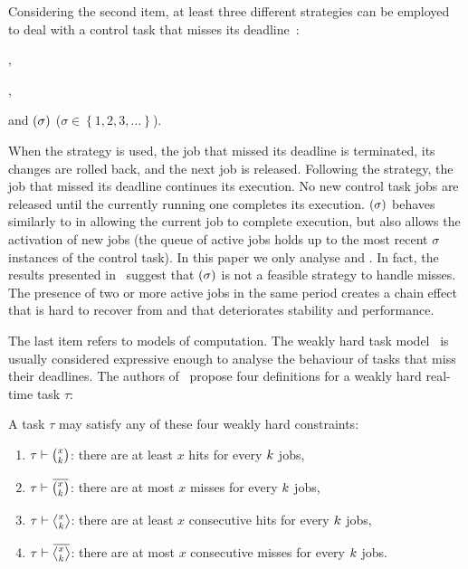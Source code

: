 Considering the second item, at least three different strategies can be employed to deal with a control task that misses its deadline~\cite{Cervin:2005}:
\begin{enumerate*}[label=(\roman*)]
    \item \emph{\tK{}},
    \item \emph{\tS{}},
    \item and \emph{\tQ{}$\left( \sigma \right)$} ($\sigma \in \left\{ 1, 2, 3, \ldots \right\}$).
\end{enumerate*}
%
When the \tK{} strategy is used, the job that missed its deadline is terminated, its changes are rolled back, and the next job is released.
Following the \tS{} strategy, the job that missed its deadline continues its execution.
No new control task jobs are released until the currently running one completes its execution.
\tQ{}$\left( \sigma \right)$ behaves similarly to \tS{} in allowing the current job to complete execution, but also allows the activation of new jobs (the queue of active jobs holds up to the most recent $\sigma$ instances of the control task).
In this paper we only analyse \tK{} and \tS{}.
In fact, the results presented in~\cite{Cervin:2005,Maggio:2020} suggest that \tQ{}$\left( \sigma \right)$ is not a feasible strategy to handle misses.
The presence of two or more active jobs in the same period creates a chain effect that is hard to recover from and that deteriorates stability and performance.

The last item refers to models of computation.
The weakly hard task model~\cite{Hamdaoui:1995, Bernat:2001} is usually considered expressive enough to analyse the behaviour of tasks that miss their deadlines.
The authors of~\cite{Bernat:2001} propose four definitions for a weakly hard real-time task $\tau$:
\begin{definition}%
    \label{def:wh-models}%
    A task $\tau$ may satisfy any of these four weakly hard constraints:
    \begin{enumerate}[label=(\roman*)]
        \item $\tau \vdash \binom{x_{}}{k_{}}$: there are at least $x$ hits for every $k$ jobs,
        \item $\tau \vdash \anymiss{}$: there are at most $x$ misses for every $k$ jobs, 
        \item $\tau \vdash \rowhit{}$: there are at least $x$ consecutive hits for every $k$ jobs,
        \item $\tau \vdash \rowmiss{}$: there are at most $x$ consecutive misses for every $k$ jobs.
    \end{enumerate}
\end{definition}

